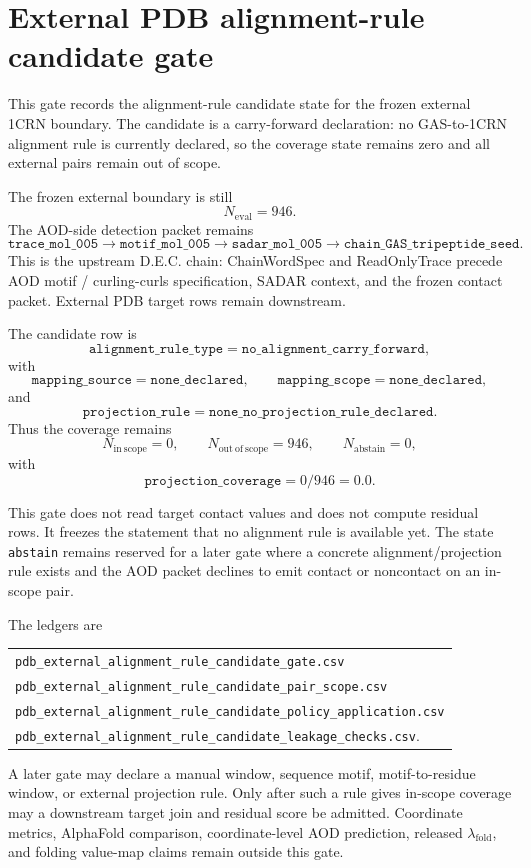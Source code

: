 \section{External PDB alignment-rule candidate gate}

This gate records the alignment-rule candidate state for the frozen external 1CRN boundary. The candidate is a carry-forward declaration: no GAS-to-1CRN alignment rule is currently declared, so the coverage state remains zero and all external pairs remain out of scope.

The frozen external boundary is still
\[
N_{\mathrm{eval}}=946.
\]
The AOD-side detection packet remains
\[
\texttt{trace\_mol\_005}\to\texttt{motif\_mol\_005}\to
\texttt{sadar\_mol\_005}\to\texttt{chain\_GAS\_tripeptide\_seed}.
\]
This is the upstream D.E.C. chain: ChainWordSpec and ReadOnlyTrace precede AOD motif / curling-curls specification, SADAR context, and the frozen contact packet. External PDB target rows remain downstream.

The candidate row is
\[
\texttt{alignment\_rule\_type}=\texttt{no\_alignment\_carry\_forward},
\]
with
\[
\texttt{mapping\_source}=\texttt{none\_declared},\qquad
\texttt{mapping\_scope}=\texttt{none\_declared},
\]
and
\[
\texttt{projection\_rule}=\texttt{none\_no\_projection\_rule\_declared}.
\]
Thus the coverage remains
\[
N_{\mathrm{in\ scope}}=0,
\qquad
N_{\mathrm{out\ of\ scope}}=946,
\qquad
N_{\mathrm{abstain}}=0,
\]
with
\[
\texttt{projection\_coverage}=0/946=0.0.
\]

This gate does not read target contact values and does not compute residual rows. It freezes the statement that no alignment rule is available yet. The state \texttt{abstain} remains reserved for a later gate where a concrete alignment/projection rule exists and the AOD packet declines to emit contact or noncontact on an in-scope pair.

The ledgers are
\begin{center}\small
\begin{tabular}{l}
\texttt{pdb\_external\_alignment\_rule\_candidate\_gate.csv}\\
\texttt{pdb\_external\_alignment\_rule\_candidate\_pair\_scope.csv}\\
\texttt{pdb\_external\_alignment\_rule\_candidate\_policy\_application.csv}\\
\texttt{pdb\_external\_alignment\_rule\_candidate\_leakage\_checks.csv}.
\end{tabular}
\end{center}
A later gate may declare a manual window, sequence motif, motif-to-residue window, or external projection rule. Only after such a rule gives in-scope coverage may a downstream target join and residual score be admitted. Coordinate metrics, AlphaFold comparison, coordinate-level AOD prediction, released \(\lambda_{\mathrm{fold}}\), and folding value-map claims remain outside this gate.
